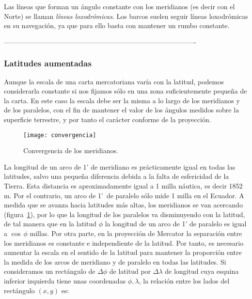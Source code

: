 Las líneas que forman un ángulo constante con los meridianos (es decir con el Norte) se llaman \emph{líneas loxodrómicas}. Los barcos suelen seguir líneas loxodrómicas en su navegación, ya que para ello basta con mantener un rumbo constante. 

-------------------------------------------------------------------------------------
\subsubsection{Latitudes aumentadas }


Aunque la escala de una carta mercatoriana varía con la latitud, podemos considerarla 
constante si nos fijamos sólo en una zona suficientemente pequeña de la carta. En este 
caso la escala debe ser la misma a lo largo de los meridianos y de los paralelos, con el fin 
de mantener el valor de los ángulos medidos sobre la superficie terrestre, y por tanto el 
carácter conforme de la proyección. 

\begin{figure}[btp]
\begin{center}
\texttt{[image: convergencia]}\\
\caption{Convergencia de los meridianos.}
\label{fg:convergencia}
\end{center}
\end{figure}

La longitud de un arco de 1’ de meridiano es prácticamente igual en todas las latitudes, 
salvo una pequeña diferencia debida a la falta de esfericidad de la Tierra. Esta distancia es 
aproximadamente igual a 1 milla náutica, es decir 1852\,m. Por el contrario, un arco de
 1’~de paralelo sólo mide 1 milla en el Ecuador. A medida que se avanza hacia latitudes más 
altas, los meridianos se van acercando (figura~\ref{fg:convergencia}), por lo que la longitud de los paralelos 
va disminuyendo con la latitud, de tal manera que en la latitud $\phi$ la longitud de un arco de 
1’ de paralelo es igual a $\cos\, \phi$ millas. Por otra parte, en la proyección de Mercator la separación entre los meridianos es constante e independiente de la latitud. Por tanto, es necesario aumentar la escala en el sentido de la latitud para mantener la proporción entre la medida de los arcos de meridiano y de paralelo en todas las latitudes. Si consideramos un rectángulo de $\Delta \phi$ de latitud por $\Delta \lambda$ de longitud cuya esquina inferior izquierda tiene unas coordenadas $\phi, \lambda$, la relación entre los lados del rectángulo $(x, y)$ es: 

